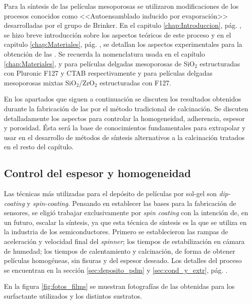 		Para la síntesis de las películas mesoporosas se utilizaron modificaciones de los procesos conocidos como <<Autoensamblado inducido por evaporación>> desarrolladas por el grupo de Brinker.\cite{Brinker1999} En el capitulo \ref{chap:Introduccion}, pág. \pageref{sec:mesoporosos}, se hizo breve introducción sobre los aspectos teóricos de este proceso y en el capitulo \ref{chap:Materiales}, pág. \pageref{sec:sintesis_mesoporosos}, se detallan los aspectos experimentales para la obtención de las \pdm. Se recuerda la nomenclatura usada en el capítulo \ref{chap:Materiales}, \pdmF\space y \pdmC\space para películas delgadas mesoporosas de SiO$_2$ estructuradas con Pluronic F127 y CTAB respectivamente y \pdmZ\space para películas delgadas mesoporosas mixtas SiO$_2$/ZrO$_2$ estructuradas con F127.

		En los apartados que siguen a continuación se discuten los resultados obtenidos durante la fabricación de las \pdm\space por el método tradicional de calcinación. Se discuten detalladamente los aspectos para controlar la homogeneidad, adherencia, espesor y porosidad. Ésta será la base de conocimientos fundamentales para extrapolar y usar en el desarrollo de métodos de síntesis alternativos a la calcinación tratados en el resto del capítulo.

	\subsection{Control del espesor y homogeneidad}
		
		Las técnicas más utilizadas para el depósito de películas por sol-gel son \textit{dip-coating} y \textit{spin-coating}. 
		Pensando en establecer las bases para la fabricación de sensores, se eligió trabajar exclusivamente por \textit{spin coating} con la intención de, en un futuro, escalar la síntesis, ya que esta técnica de síntesis es la que se utiliza en la industria de los semiconductores.\cite{Franssila2004,Jaeger2001} Primero se establecieron las rampas de aceleración y velocidad final del \textit{spinner}; los tiempos de estabilización en cámara de humedad; los tiempos de calentamiento y calcinación, de forma de obtener películas homogéneas, sin fisuras y del espesor deseado. Los detalles del proceso se encuentran en la sección \ref{sec:deposito_pdm} y \ref{sec:cond_y_extr}, pág. \pageref{sec:deposito_pdm}. 

		En la figura \ref{fig:fotos_films} se muestran fotografías de las \pdm\space obtenidas para los surfactante utilizados y los distintos sustratos. 


